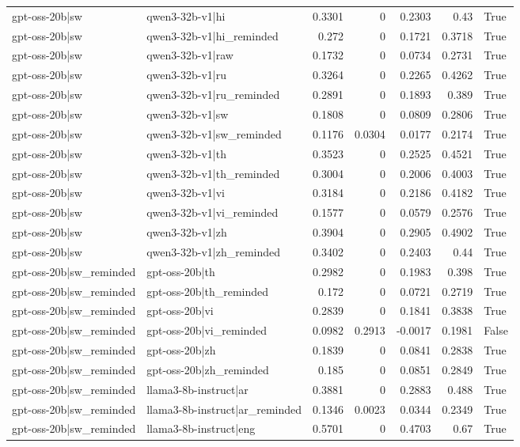 \begin{table}
\begin{tabular}{l l r r r r l}
gpt-oss-20b|sw & qwen3-32b-v1|hi & 0.3301 & 0 & 0.2303 & 0.43 & True \\
gpt-oss-20b|sw & qwen3-32b-v1|hi_reminded & 0.272 & 0 & 0.1721 & 0.3718 & True \\
gpt-oss-20b|sw & qwen3-32b-v1|raw & 0.1732 & 0 & 0.0734 & 0.2731 & True \\
gpt-oss-20b|sw & qwen3-32b-v1|ru & 0.3264 & 0 & 0.2265 & 0.4262 & True \\
gpt-oss-20b|sw & qwen3-32b-v1|ru_reminded & 0.2891 & 0 & 0.1893 & 0.389 & True \\
gpt-oss-20b|sw & qwen3-32b-v1|sw & 0.1808 & 0 & 0.0809 & 0.2806 & True \\
gpt-oss-20b|sw & qwen3-32b-v1|sw_reminded & 0.1176 & 0.0304 & 0.0177 & 0.2174 & True \\
gpt-oss-20b|sw & qwen3-32b-v1|th & 0.3523 & 0 & 0.2525 & 0.4521 & True \\
gpt-oss-20b|sw & qwen3-32b-v1|th_reminded & 0.3004 & 0 & 0.2006 & 0.4003 & True \\
gpt-oss-20b|sw & qwen3-32b-v1|vi & 0.3184 & 0 & 0.2186 & 0.4182 & True \\
gpt-oss-20b|sw & qwen3-32b-v1|vi_reminded & 0.1577 & 0 & 0.0579 & 0.2576 & True \\
gpt-oss-20b|sw & qwen3-32b-v1|zh & 0.3904 & 0 & 0.2905 & 0.4902 & True \\
gpt-oss-20b|sw & qwen3-32b-v1|zh_reminded & 0.3402 & 0 & 0.2403 & 0.44 & True \\
gpt-oss-20b|sw_reminded & gpt-oss-20b|th & 0.2982 & 0 & 0.1983 & 0.398 & True \\
gpt-oss-20b|sw_reminded & gpt-oss-20b|th_reminded & 0.172 & 0 & 0.0721 & 0.2719 & True \\
gpt-oss-20b|sw_reminded & gpt-oss-20b|vi & 0.2839 & 0 & 0.1841 & 0.3838 & True \\
gpt-oss-20b|sw_reminded & gpt-oss-20b|vi_reminded & 0.0982 & 0.2913 & -0.0017 & 0.1981 & False \\
gpt-oss-20b|sw_reminded & gpt-oss-20b|zh & 0.1839 & 0 & 0.0841 & 0.2838 & True \\
gpt-oss-20b|sw_reminded & gpt-oss-20b|zh_reminded & 0.185 & 0 & 0.0851 & 0.2849 & True \\
gpt-oss-20b|sw_reminded & llama3-8b-instruct|ar & 0.3881 & 0 & 0.2883 & 0.488 & True \\
gpt-oss-20b|sw_reminded & llama3-8b-instruct|ar_reminded & 0.1346 & 0.0023 & 0.0344 & 0.2349 & True \\
gpt-oss-20b|sw_reminded & llama3-8b-instruct|eng & 0.5701 & 0 & 0.4703 & 0.67 & True \\

\end{tabular}
\end{table}
